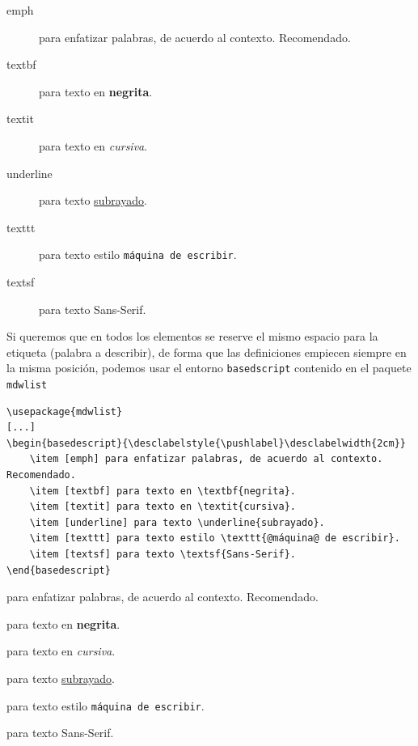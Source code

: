 \documentclass[12pt,a4paper, oneside]{report}
\begin{document}
\begin{description}
	\item [emph] para enfatizar palabras, de acuerdo al contexto. Recomendado.
	\item [textbf] para texto en \textbf{negrita}.
	\item [textit] para texto en \textit{cursiva}.
	\item [underline] para texto \underline{subrayado}.
	\item [texttt] para texto estilo \texttt{máquina de escribir}.
	\item [textsf] para texto \textsf{Sans-Serif}.
\end{description}

Si queremos que en todos los elementos se reserve el mismo espacio para la etiqueta (palabra a describir), de forma que las definiciones empiecen siempre en la misma posición, podemos usar el entorno \verb+basedscript+ contenido en el paquete \verb+mdwlist+

\begin{lstlisting}
\usepackage{mdwlist}
[...]
\begin{basedescript}{\desclabelstyle{\pushlabel}\desclabelwidth{2cm}}
	\item [emph] para enfatizar palabras, de acuerdo al contexto. Recomendado.
	\item [textbf] para texto en \textbf{negrita}.
	\item [textit] para texto en \textit{cursiva}.
	\item [underline] para texto \underline{subrayado}.
	\item [texttt] para texto estilo \texttt{@máquina@ de escribir}.
	\item [textsf] para texto \textsf{Sans-Serif}.
\end{basedescript}
\end{lstlisting}




\begin{basedescript}{\desclabelstyle{\pushlabel}\desclabelwidth{2cm}}
	\item [emph] para enfatizar palabras, de acuerdo al contexto. Recomendado.
	\item [textbf] para texto en \textbf{negrita}.
	\item [textit] para texto en \textit{cursiva}.
	\item [underline] para texto \underline{subrayado}.
	\item [texttt] para texto estilo \texttt{máquina de escribir}.
	\item [textsf] para texto \textsf{Sans-Serif}.
\end{basedescript}
\end{document}
